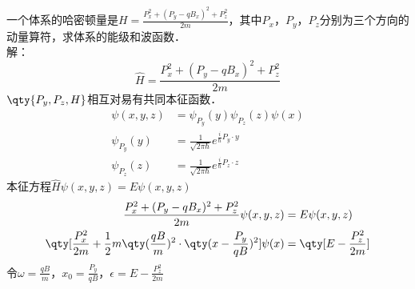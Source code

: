 \subsection{ }
一个体系的哈密顿量是$H=\frac{P^2_x+(P_y-qB_x)^2+P^2_z}{2m}$，其中$P_x$，$P_y$，$P_z$分别为三个方向的动量算符，求体系的能级和波函数．\\
解：
\begin{equation}
\hat{H}=\frac{P^2_x+(P_y-qB_x)^2+P^2_z}{2m}
\end{equation}
$\qty{P_y,P_z,H}$相互对易有共同本征函数．\\
\begin{equation}
\begin{aligned}
\psi(x,y,z)&=\psi_{P_y}(y)\psi_{P_z}(z)\psi(x)\\
\psi_{P_y}(y)&=\frac{1}{\sqrt{2\pi\hbar}}e^{\frac{i}{\hbar}P_{y} \cdot y}\\
\psi_{P_z}(z)&=\frac{1}{\sqrt{2\pi\hbar}}e^{\frac{i}{\hbar}P_{z} \cdot z}
\end{aligned}
\end{equation}
本征方程$\hat{H}\psi(x,y,z)=E\psi(x,y,z) $\\
\begin{equation}
\begin{aligned}
\frac{P^2_x+(P_y-qB_x)^2+P^2_z}{2m}\psi(x,y,z)&=E\psi(x,y,z)\\
\qty[\frac{P^2_x}{2m}+\frac{1}{2}m\qty(\frac{qB}{m})^2\cdot \qty(x-\frac{P_y}{qB})^2]\psi(x)&=\qty[E-\frac{P^2_z}{2m}]\\
\end{aligned}
\end{equation}
令$\omega=\frac{qB}{m}$，$x_0=\frac{P_y}{qB}$，$\epsilon=E-\frac{P^2_z}{2m}$
